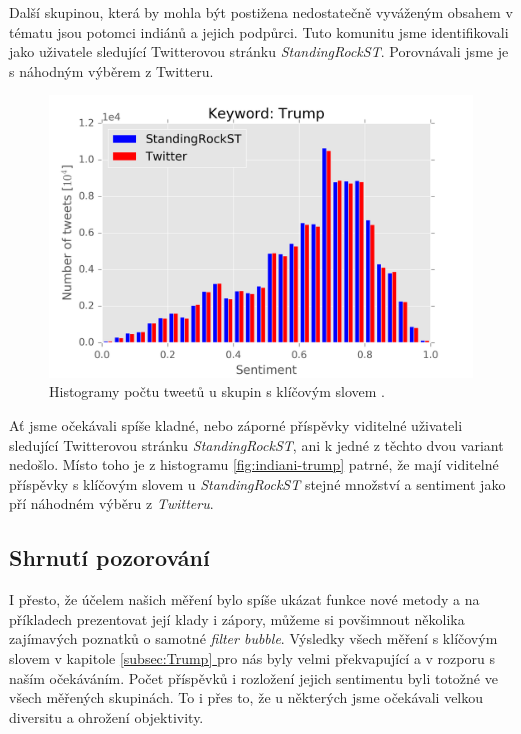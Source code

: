 \documentclass[12pt, a4paper]{article}
\newcommand*{\fullref}[1]{\hyperref[{#1}]{\ref*{#1} \nameref*{#1}}} %
\numberwithin{equation}{section} 	%
\begin{document}
Další skupinou, která by mohla být postižena nedostatečně vyváženým obsahem v tématu \textit{} jsou potomci indiánů a jejich podpůrci. Tuto komunitu jsme identifikovali jako uživatele sledující Twitterovou stránku \textit{StandingRockST}. Porovnávali jsme je s náhodným výběrem z Twitteru.
\begin{figure}[h]
\centering
\includegraphics[scale=0.5]{./Pics/indiani-trump.png}
\caption{Histogramy počtu tweetů u skupin s klíčovým slovem \textit{}.}
\label{fig:indiani-trump}
\end{figure}

Ať jsme očekávali spíše kladné, nebo záporné příspěvky viditelné uživateli sledující Twitterovou stránku \textit{StandingRockST}, ani k jedné z těchto dvou variant nedošlo. Místo toho je z histogramu \autoref{fig:indiani-trump} patrné, že mají viditelné příspěvky s klíčovým slovem \textit{} u \textit{StandingRockST} stejné množství a sentiment jako pří náhodném výběru z \textit{Twitteru}.

\subsection{Shrnutí pozorování}
\noindent I přesto, že účelem našich měření bylo spíše ukázat funkce nové metody a na příkladech prezentovat její klady i zápory, můžeme si povšimnout několika zajímavých poznatků o samotné \textit{filter bubble}. Výsledky všech měření s klíčovým slovem \textit{} v kapitole \fullref{subsec:Trump} pro nás byly velmi překvapující a v rozporu s naším očekáváním. Počet příspěvků i rozložení jejich sentimentu byli totožné ve všech měřených skupinách. To i přes to, že u některých jsme očekávali velkou diversitu a ohrožení objektivity.
\end{document}
